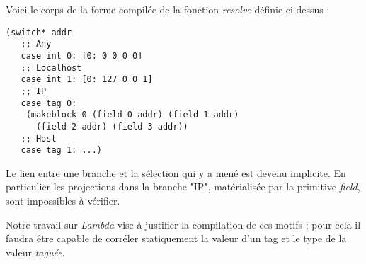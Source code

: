 Voici le corps de la forme compilée de la fonction \emph{resolve} définie
ci-dessus :

\lstset{language=Lisp}
\begin{lstlisting}
(switch* addr
   ;; Any
   case int 0: [0: 0 0 0 0]
   ;; Localhost
   case int 1: [0: 127 0 0 1]
   ;; IP
   case tag 0:
    (makeblock 0 (field 0 addr) (field 1 addr)
      (field 2 addr) (field 3 addr))
   ;; Host
   case tag 1: ...)
\end{lstlisting}
\lstset{language=Caml}

Le lien entre une branche et la sélection qui y a mené est devenu implicite.
En particulier les projections dans la branche "IP", matérialisée par la
primitive \emph{field}, sont impossibles à vérifier.

Notre travail sur \emph{Lambda} vise à justifier la compilation de ces motifs ;
pour cela il faudra être capable de corréler statiquement la valeur d'un tag et
le type de la valeur \emph{taguée}.

